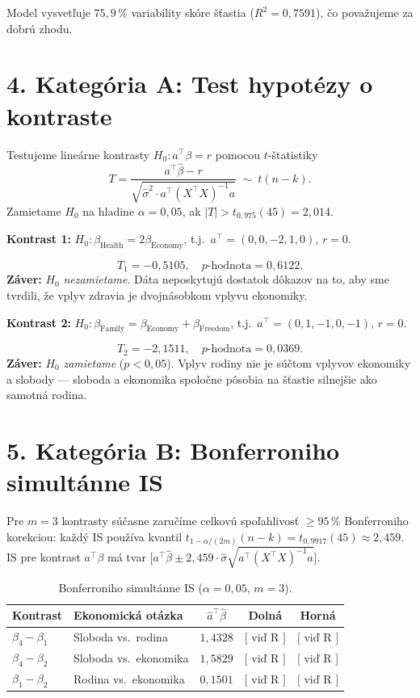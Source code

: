 \documentclass[12pt,a4paper]{article}
\begin{document}
Model vysvetľuje $75{,}9\,\%$ variability skóre šťastia
($R^2 = 0{,}7591$), čo považujeme za dobrú zhodu.

\section*{4. Kategória A: Test hypotézy o kontraste}

Testujeme lineárne kontrasty $H_0\colon a^\top\beta = r$
pomocou $t$-štatistiky
\[
  T = \frac{a^\top\hat{\beta} - r}{\sqrt{\hat{\sigma}^2 \cdot
  a^\top(X^\top X)^{-1}a}} \;\sim\; t(n-k).
\]
Zamietame $H_0$ na hladine $\alpha = 0{,}05$, ak $|T| > t_{0{,}975}(45) = 2{,}014$.

\medskip
\textbf{Kontrast 1:} $H_0\colon \beta_{\text{Health}} = 2\beta_{\text{Economy}}$,
t.j.\ $a^\top = (0,0,-2,1,0)$, $r=0$.

\[
  T_1 = -0{,}5105, \quad p\text{-hodnota} = 0{,}6122.
\]
\textbf{Záver:} $H_0$ \textit{nezamietame}. Dáta neposkytujú dostatok
dôkazov na to, aby sme tvrdili, že vplyv zdravia je dvojnásobkom
vplyvu ekonomiky.

\medskip
\textbf{Kontrast 2:} $H_0\colon \beta_{\text{Family}} = \beta_{\text{Economy}} + \beta_{\text{Freedom}}$,
t.j.\ $a^\top = (0,1,-1,0,-1)$, $r=0$.

\[
  T_2 = -2{,}1511, \quad p\text{-hodnota} = 0{,}0369.
\]
\textbf{Záver:} $H_0$ \textit{zamietame} ($p < 0{,}05$). Vplyv rodiny
nie je súčtom vplyvov ekonomiky a slobody --- sloboda a ekonomika
spoločne pôsobia na šťastie silnejšie ako samotná rodina.

\section*{5. Kategória B: Bonferroniho simultánne IS}

Pre $m = 3$ kontrasty súčasne zaručíme celkovú spoľahlivosť $\geq 95\,\%$
Bonferroniho korekciou: každý IS používa kvantil
$t_{1-\alpha/(2m)}(n-k) = t_{0{,}9917}(45) \approx 2{,}459$.
IS pre kontrast $a^\top\beta$ má tvar
$\bigl[a^\top\hat{\beta} \pm 2{,}459\cdot\hat{\sigma}\sqrt{a^\top(X^\top X)^{-1}a}\bigr]$.

\begin{table}[h!]
\centering
\begin{tabular}{llccc}
\toprule
Kontrast & Ekonomická otázka & $\hat{a}^\top\hat{\beta}$ & Dolná & Horná \\
\midrule
$\beta_4 - \beta_1$ & Sloboda vs.\ rodina   & $1{,}4328$ & $[$ viď R $]$ & $[$ viď R $]$ \\
$\beta_4 - \beta_2$ & Sloboda vs.\ ekonomika & $1{,}5829$ & $[$ viď R $]$ & $[$ viď R $]$ \\
$\beta_1 - \beta_2$ & Rodina vs.\ ekonomika  & $0{,}1501$ & $[$ viď R $]$ & $[$ viď R $]$ \\
\bottomrule
\end{tabular}
\caption{Bonferroniho simultánne IS ($\alpha = 0{,}05$, $m=3$).}
\end{table}
\end{document}
